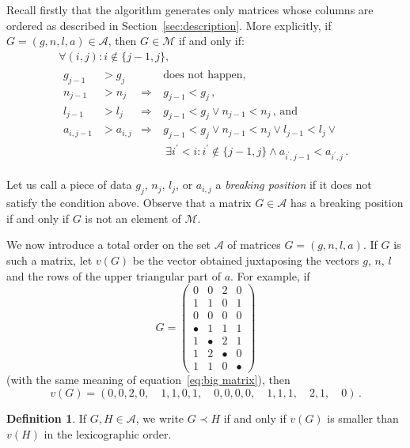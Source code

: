 \documentclass{amsart}
\theoremstyle{plain}
\theoremstyle{definition}
\newtheorem{definition}[theorem]{Definition}
\begin{document}
Recall firstly that the algorithm generates only matrices whose
columns are ordered as described in
Section~\ref{sec:description}. More explicitly, if $G = (g, n, l, a)
\in \mathcal{A}$, then $G \in \mathcal{M}$ if and only if:
\begin{multline*}
  \forall (i,j)\colon
  i \not\in \{j-1, j\},\\
  \begin{aligned}
    g_{j-1} &> g_j &&\text{does not happen,}\\
    n_{j-1} &> n_j &\Rightarrow\  & g_{j-1} < g_j\,\text{,}\\
    l_{j-1} &> l_j &\Rightarrow\  & g_{j-1} < g_j \vee n_{j-1} < n_j\,\text{, and}\\
    a_{i,j-1} &> a_{i,j} &\Rightarrow\ & g_{j-1} < g_j \vee n_{j-1} < n_j \vee l_{j-1} < l_j \vee\\
    &&&\ \exists i^\prime < i: i^\prime \not\in \{j-1,j\} \wedge a_{i^\prime,j-1} < a_{i^\prime,j}\,\text{.}
  \end{aligned}
\end{multline*}

Let us call a piece of data $g_j$, $n_j$, $l_j$, or $a_{i,j}$ a
\emph{breaking position\/} if it does not satisfy the condition
above. Observe that a matrix $G \in \mathcal{A}$ has a breaking
position if and only if $G$ is not an element of $\mathcal{M}$.

We now introduce a total order on the set $\mathcal{A}$ of matrices $G
= (g,n,l,a)$. If $G$ is such a matrix, let $v(G)$ be the vector
obtained juxtaposing the vectors $g$, $n$, $l$ and the rows of the
upper triangular part of $a$. For example, if
\[
  G = \begin{pmatrix}
    0 & 0 & 2 & 0\\
    1 & 1 & 0 & 1\\
    0 & 0 & 0 & 0\\
    \hline
    \bullet & 1 & 1 & 1\\
    1 & \bullet & 2 & 1\\
    1 & 2 & \bullet & 0\\
    1 & 1 & 0 & \bullet
  \end{pmatrix}
\]
(with the same meaning of equation~\ref{eq:big matrix}), then
\[
v(G) = (0, 0, 2, 0,\quad 1, 1, 0, 1,\quad 0, 0, 0, 0,\quad 1, 1,
1,\quad 2, 1,\quad 0)\,\text{.}
\]

\begin{definition}\label{def:order}
  If $G, H \in \mathcal{A}$, we write $G \prec H$ if and only if
  $v(G)$ is smaller than $v(H)$ in the lexicographic order.
\end{definition}
\end{document}
